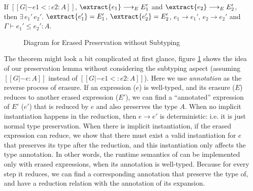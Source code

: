 \begin{theorem}
    If $[[G |- e1 <: e2 : A]]$, $\extract{e_1} \longrightarrow_E E_1'$ and $\extract{e_2} \longrightarrow_E E_2'$,
    then $\exists\,e_1' \, e_2'.$ $\extract{e_1'} = E_1'$, $\extract{e_2'} = E_2'$,
    $e_1 \longrightarrow e_1'$, $e_2 \longrightarrow e_2'$ and $\Gamma \vdash e_1' \le e_2' : A$.
\end{theorem}

\begin{figure}
    \centering
    \caption{Diagram for Erased Preservation without Subtyping}
    \label{fig:preservation}
\end{figure}

\noindent The theorem might look a bit complicated at first glance, figure
\ref{fig:preservation} shows the idea of our preservation lemma without
considering the subtyping aspect (assuming $[[G |- e : A]]$ instead of $[[G |- e1 <: e2 : A]]$).
Here we use \emph{annotation} as the reverse process of erasure.
If an expression ($e$) is well-typed, and its erasure ($E$)
reduces to another erased expression ($E'$), we can find a ``annotated''
expression of $E'$ ($e'$) that is reduced by $e$ and also preserves the type $A$.
When no implicit instantiation happens in the reduction, then $e \longrightarrow e'$
is deterministic: i.e. it is just normal type preservation. When there is implicit
instantiation, if the erased expression can reduce, we show that there must
exist a valid instantiation for $e$ that preserves its type after the reduction, and
this instantiation only affects the type annotation.
In other words, the runtime semantics of \name can be implemented only with
erased expressions, when its annotation is well-typed.
Because for every step it reduces, we can find a corresponding annotation that
preserve the type of, and have a reduction relation with the
annotation of its expansion.

